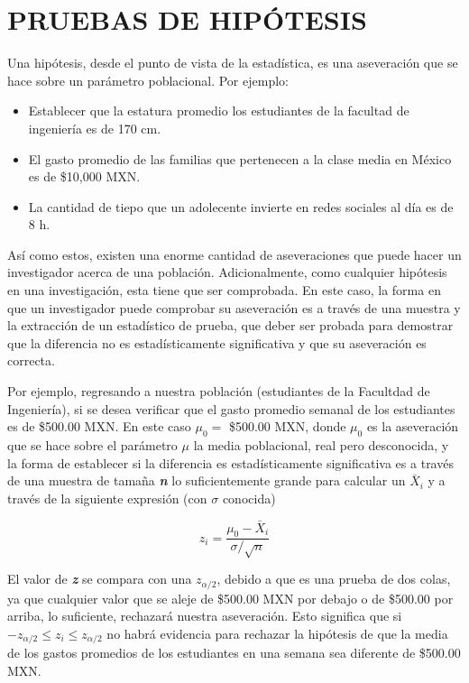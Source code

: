 \documentclass[
  oneside]{book}
\begin{document}
\section{PRUEBAS DE HIPÓTESIS}\label{pruebas-de-hipuxf3tesis}

Una hipótesis, desde el punto de vista de la estadística, es una aseveración que se hace sobre un parámetro poblacional. Por ejemplo:

\begin{itemize}
\item
  Establecer que la estatura promedio los estudiantes de la facultad de ingeniería es de 170 cm.
\item
  El gasto promedio de las familias que pertenecen a la clase media en México es de \$10,000 MXN.
\item
  La cantidad de tiepo que un adolecente invierte en redes sociales al día es de 8 h.
\end{itemize}

Así como estos, existen una enorme cantidad de aseveraciones que puede hacer un investigador acerca de una población. Adicionalmente, como cualquier hipótesis en una investigación, esta tiene que ser comprobada. En este caso, la forma en que un investigador puede comprobar su aseveración es a través de una muestra y la extracción de un estadístico de prueba, que deber ser probada para demostrar que la diferencia no es estadísticamente significativa y que su aseveración es correcta.

Por ejemplo, regresando a nuestra población (estudiantes de la Facultdad de Ingeniería), si se desea verificar que el gasto promedio semanal de los estudiantes es de \$500.00 MXN. En este caso \(\mu_0=\) \$500.00 MXN, donde \(\mu_0\) es la aseveración que se hace sobre el parámetro \(\mu\) la media poblacional, real pero desconocida, y la forma de establecer si la diferencia es estadísticamente significativa es a través de una muestra de tamaña \textbf{\emph{n}} lo suficientemente grande para calcular un \(\bar{X}_i\) y a través de la siguiente expresión (con \(\sigma\) conocida)

\begin{equation}
z_i=\frac{\mu_0-\bar{X}_i}{\sigma/\sqrt{n}}
\end{equation}

El valor de \textbf{\emph{z}} se compara con una \(z_{\alpha/2}\), debido a que es una prueba de dos colas, ya que cualquier valor que se aleje de \$500.00 MXN por debajo o de \$500.00 por arriba, lo suficiente, rechazará nuestra aseveración. Esto significa que si \(-z_{\alpha/2} \leq z_i\leq z_{\alpha/2}\) no habrá evidencia para rechazar la hipótesis de que la media de los gastos promedios de los estudiantes en una semana sea diferente de \$500.00 MXN.
\end{document}
